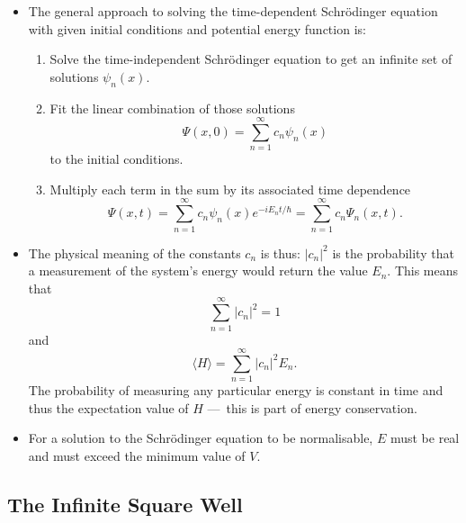 \documentclass{article}
\newcommand{\ev}[1]{\langle #1 \rangle}
\begin{document}
\begin{itemize}
  \item The general approach to solving the time-dependent Schrödinger equation with given initial conditions and potential energy function is:

        \begin{enumerate}
          \item Solve the time-independent Schrödinger equation to get an infinite set of solutions $\psi_n(x)$.

          \item Fit the linear combination of those solutions \[\Psi(x, 0) = \sum_{n = 1}^\infty c_n \psi_n(x)\] to the initial conditions.

          \item Multiply each term in the sum by its associated time dependence \[\Psi(x, t) = \sum_{n = 1}^\infty c_n \psi_n(x) e^{-i E_n t / \hbar} = \sum_{n = 1}^\infty c_n \Psi_n(x, t).\]
        \end{enumerate}

  \item The physical meaning of the constants $c_n$ is thus: $|c_n|^2$ is the probability that a measurement of the system's energy would return the value $E_n$. This means that \[\sum_{n = 1}^\infty |c_n|^2 = 1\] and \[\ev{H} = \sum_{n = 1}^\infty |c_n|^2 E_n.\] The probability of measuring any particular energy is constant in time and thus the expectation value of $H$ — this is part of energy conservation.

  \item For a solution to the Schrödinger equation to be normalisable, $E$ must be real and must exceed the minimum value of $V$.
\end{itemize}

\subsection{The Infinite Square Well}
\end{document}
